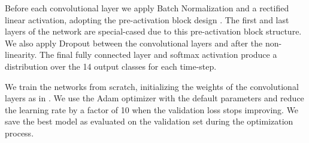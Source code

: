 Before each convolutional layer we apply Batch Normalization
\cite{ioffe2015batch} and a rectified linear activation, adopting the
pre-activation block design \cite{he2016deep}. The first and last layers of the
network are special-cased due to this pre-activation block structure. We also
apply Dropout \cite{srivastava2014dropout} between the convolutional layers and
after the non-linearity. The final fully connected layer and softmax activation
produce a distribution over the 14 output classes for each time-step.

We train the networks from scratch, initializing the weights of the
convolutional layers as in \cite{he2015delving}. We use the Adam
\cite{kingma2014adam} optimizer with the default parameters and reduce the
learning rate by a factor of 10 when the validation loss stops improving. We
save the best model as evaluated on the validation set during the optimization
process.
